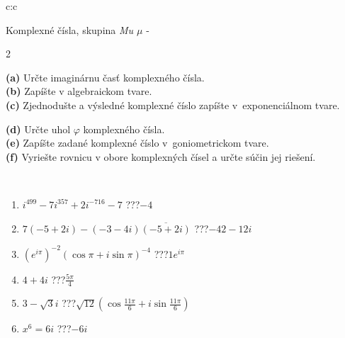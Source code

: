 \documentclass[10pt]{report}
\begin{document}
\begin{tabular}{c:c}
\begin{minipage}[c][104.5mm][t]{0.5\linewidth}
\begin{center}
\vspace{7mm}
{\huge Komplexné čísla, skupina \textit{Mu $\mu$} -}\\[5mm]
\begin{minipage}{0.95\linewidth}
\begin{center}
{\small \begin{multicols}{2} \raggedright
\textbf{(a)} Určte imaginárnu časť komplexného čísla. \\[1mm]
\textbf{(b)} Zapíšte v algebraickom tvare. \\[1mm]
\textbf{(c)} Zjednodušte a výsledné komplexné číslo zapíšte v~exponenciálnom tvare. \par \columnbreak
\textbf{(d)} Určte uhol \(\varphi\) komplexného čísla. \\[1mm]
\textbf{(e)} Zapíšte zadané komplexné číslo v~goniometrickom tvare. \\[1mm]
\textbf{(f)} Vyriešte rovnicu v obore komplexných čísel a určte súčin jej riešení.
\end{multicols}
}
\end{center}
\end{minipage}
\\[4mm]
\begin{minipage}{0.79\linewidth}
\begin{center}
\begin{varwidth}{\linewidth}
\begin{enumerate}
\large
\item $i^{499}-7i^{357}+2i^{-716}-7$\quad \dotfill\; ???\;\dotfill \quad $-4$
\item $7(-5+2i)-(-3-4i)\overline{(-5+2i)}$\quad \dotfill\; ???\;\dotfill \quad $-42-12i$
\item $\left(e^{i\pi}\right)^{-2}\left(\cos{\pi}+i\sin{\pi}\right)^{-4}$\quad \dotfill\; ???\;\dotfill \quad $1e^{i\pi}$
\item $4+4i$\quad \dotfill\; ???\;\dotfill \quad $\frac{5\pi}{4}$
\item $3-\sqrt{3}i$\quad \dotfill\; ???\;\dotfill \quad $\sqrt{12}\left(\cos{\frac{11\pi}{6}}+i\sin{\frac{11\pi}{6}}\right)$
\item $x^6=6i$\quad \dotfill\; ???\;\dotfill \quad $-6i$
\end{enumerate}
\end{varwidth}
\end{center}

\end{minipage}
\end{center}
\end{minipage}
\end{tabular}
\end{document}
